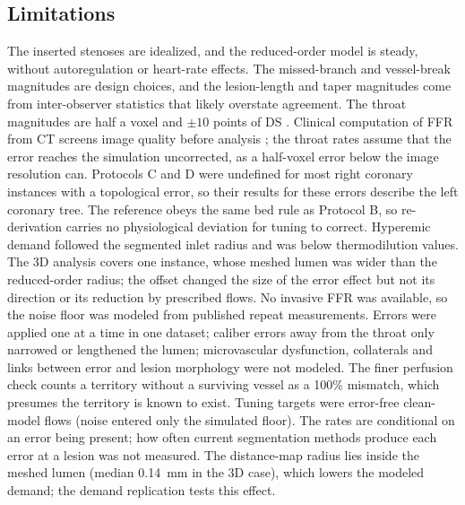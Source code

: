 \documentclass[journal,twoside,web]{ieeecolor}
\begin{document}
\subsection{Limitations}
The inserted stenoses are idealized, and the reduced-order model is steady, without autoregulation or heart-rate
effects. The missed-branch and vessel-break magnitudes are design choices, and the lesion-length and taper magnitudes come from
inter-observer statistics that likely overstate agreement. The throat magnitudes are half a voxel and $\pm 10$ points of DS \cite{boogers2010,gouya2009}. Clinical computation of FFR from CT screens image quality before analysis \cite{norgaard2014}; the throat rates assume that the error reaches the simulation uncorrected, as a half-voxel error below
the image resolution can. Protocols C and D were undefined for most right coronary
instances with a topological error, so their results for these errors describe the left coronary tree. The reference obeys the same bed rule as Protocol B, so re-derivation carries no physiological deviation for tuning to correct. Hyperemic demand followed the segmented inlet radius and was below thermodilution values. The 3D analysis covers one instance, whose meshed lumen was wider than the reduced-order radius; the offset changed the size of the error effect but not its direction or its reduction by prescribed flows. No invasive FFR was available, so the noise floor was modeled from published repeat
measurements. Errors were applied one at a time in one dataset; caliber errors away from the throat only narrowed or lengthened the lumen; microvascular
dysfunction, collaterals and links between error and lesion morphology were not modeled. The finer perfusion check counts a territory without a surviving vessel as a 100\% mismatch, which presumes the territory is known to exist. Tuning targets were error-free clean-model flows
(noise entered only the simulated floor). The rates are conditional on an error being present; how often current
segmentation methods produce each error at a lesion was not measured. The distance-map radius lies inside the
meshed lumen (median 0.14~mm in the 3D case), which lowers the modeled demand; the demand replication tests this
effect.
\end{document}
